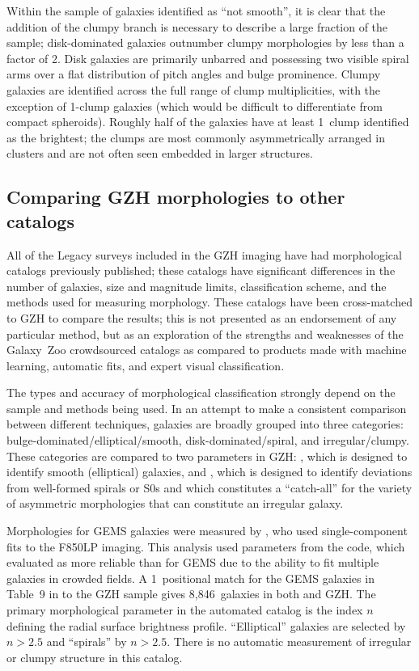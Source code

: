 \documentclass[twocolumn]{aastex6}
\begin{document}
Within the sample of galaxies identified as ``not smooth'', it is clear that
the addition of the clumpy branch is necessary to describe a large fraction of
the sample; disk-dominated galaxies outnumber clumpy morphologies by less than
a factor of 2. Disk galaxies are primarily unbarred \citet{mel14} and
possessing two visible spiral arms over a flat distribution of pitch angles and
bulge prominence. Clumpy galaxies are identified across the full range of clump
multiplicities, with the exception of 1-clump galaxies (which would be
difficult to differentiate from compact spheroids). Roughly half of the
galaxies have at least 1~clump identified as the brightest; the clumps are most
commonly asymmetrically arranged in clusters and are not often seen embedded in
larger structures. 

\subsection{Comparing GZH morphologies to other catalogs}\label{ssec:comparisons}

All of the Legacy surveys included in the GZH imaging have had morphological
catalogs previously published; these catalogs have significant differences in
the number of galaxies, size and magnitude limits, classification scheme, and
the methods used for measuring morphology. These catalogs have been
cross-matched to GZH to compare the results; this is not presented as an
endorsement of any particular method, but as an exploration of the strengths
and weaknesses of the Galaxy~Zoo crowdsourced catalogs as compared to products made
with machine learning, automatic fits, and expert visual classification. 

The types and accuracy of morphological classification strongly depend on the
sample and methods being used. In an attempt to make a consistent comparison
between different techniques, galaxies are broadly grouped into three
categories: bulge-dominated/elliptical/smooth, disk-dominated/spiral, and
irregular/clumpy. These categories are compared to two parameters in GZH:
\fbest, which is designed to identify smooth (elliptical) galaxies, and \fodd,
which is designed to identify deviations from well-formed spirals or S0s and
which constitutes a ``catch-all'' for the variety of asymmetric morphologies
that can constitute an irregular galaxy. 

Morphologies for GEMS galaxies were measured by \citet{hau07}, who used
single-component \sersic{} fits to the F850LP imaging. This analysis used
parameters from the \galfit{} code, which \citet{hau07} evaluated as more
reliable than \gimtwod{} for GEMS due to the ability to fit multiple galaxies
in crowded fields. A 1\arcsec~positional match for the GEMS galaxies in Table~9
in \citet{hau07} to the GZH sample gives 8,846~galaxies in both \citet{hau07}
and GZH. The primary morphological parameter in the automated catalog is the
\sersic{} index $n$ defining the radial surface brightness profile.
``Elliptical'' galaxies are selected by $n>2.5$ and ``spirals''  by $n>2.5$.
There is no automatic measurement of irregular or clumpy structure in this
catalog. 
\end{document}
